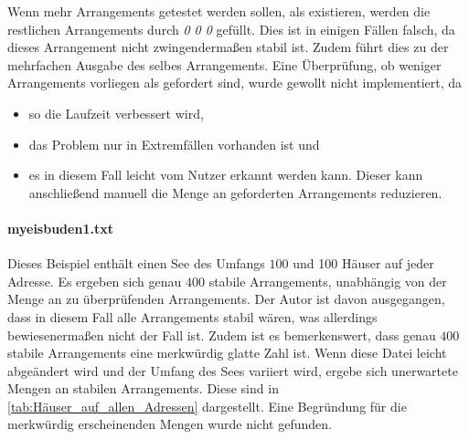 \documentclass[a4paper,10pt,ngerman,captions=figureheading]{scrartcl}
\begin{document}
Wenn mehr Arrangements getestet werden sollen, als existieren, werden die restlichen Arrangements durch \emph{0 0 0} gefüllt.
Dies ist in einigen Fällen falsch, da dieses Arrangement nicht zwingendermaßen stabil ist.
Zudem führt dies zu der mehrfachen Ausgabe des selbes Arrangements.
Eine Überprüfung, ob weniger Arrangements vorliegen als gefordert sind, wurde gewollt nicht implementiert, da
\begin{itemize}
    \item so die Laufzeit verbessert wird,
    \item das Problem nur in Extremfällen vorhanden ist und
    \item es in diesem Fall leicht vom Nutzer erkannt werden kann.
          Dieser kann anschließend manuell die Menge an geforderten Arrangements reduzieren.
\end{itemize}

\paragraph{myeisbuden1.txt}
Dieses Beispiel enthält einen See des Umfangs $100$ und 100 Häuser auf jeder Adresse.
Es ergeben sich genau $400$ stabile Arrangements, unabhängig von der Menge an zu überprüfenden Arrangements.
Der Autor ist davon ausgegangen, dass in diesem Fall alle Arrangements stabil wären, was allerdings bewiesenermaßen nicht der Fall ist.
Zudem ist es bemerkenswert, dass genau $400$ stabile Arrangements eine merkwürdig \glqq glatte\grqq{} Zahl ist.
Wenn diese Datei leicht abgeändert wird und der Umfang des Sees variiert wird, ergebe sich unerwartete Mengen an stabilen Arrangements.
Diese sind in \autoref{tab:Häuser_auf_allen_Adressen} dargestellt.
Eine Begründung für die merkwürdig erscheinenden Mengen wurde nicht gefunden.
\end{document}
